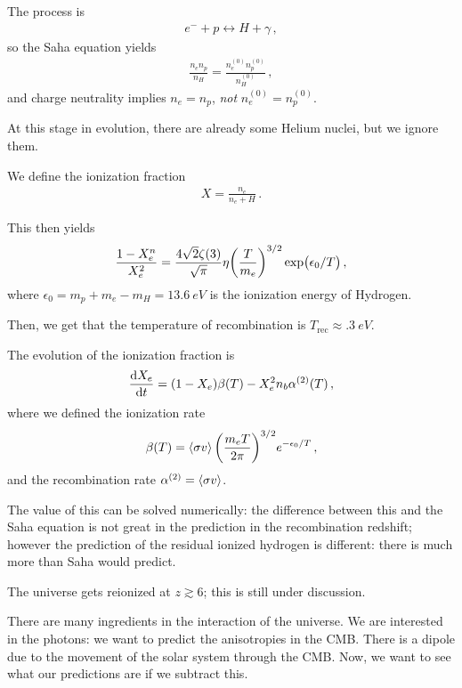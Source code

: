 \documentclass[main.tex]{subfiles}
\begin{document}
The process is 
%
\begin{align}
e^{-} + p \leftrightarrow H + \gamma 
\,,
\end{align}
%
so the Saha equation yields 
%
\begin{align}
\frac{n_e n_p}{n_H} = \frac{n_e^{(0)} n_p^{(0)}}{n_H^{(0)}}
\,,
\end{align}
%
and charge neutrality implies \(n_e = n_p\), \emph{not} \(n_e^{(0)} = n_p^{(0)}\). 

At this stage in evolution, there are already some Helium nuclei, but we ignore them. 

We define the ionization fraction 
%
\begin{align}
X = \frac{n_e}{n_e + H}
\,.
\end{align}

This then yields 
%
\begin{align}
\frac{1 - X_e^{n}}{X_e^{2}} = \frac{4 \sqrt{2} \zeta (3)}{\sqrt{\pi }} \eta \qty(\frac{T}{m_e})^{3/2} \exp(\epsilon_{0} / T)
\,,
\end{align}
%
where \(\epsilon_0 = m_p + m_e - m_H = \SI{13.6}{eV}\) is the ionization energy of Hydrogen. 

Then, we get that the temperature of recombination is \(T _{\text{rec}} \approx \SI{.3}{eV}\). 

The evolution of the ionization fraction is 
%
\begin{align}
\dv{X_{e}}{t} = (1-X_{e}) \beta (T) - X^2_{e} n_b \alpha^{(2)} (T)
\,,
\end{align}
%
where we defined the ionization rate 
%
\begin{align}
\beta (T) = \expval{\sigma v} \qty(\frac{m_e T}{2 \pi })^{3/2} e^{- \epsilon_0 /T}
\,,
\end{align}
%
and the recombination rate \(\alpha^{(2)} = \expval{\sigma v}\). 

The value of this can be solved numerically: the difference between this and the Saha equation is not great in the prediction in the recombination redshift; however the prediction of the residual ionized hydrogen is different: there is much more than Saha would predict. 

The universe gets reionized at \(z \gtrsim 6\); this is still under discussion. 

There are many ingredients in the interaction of the universe. We are interested in the photons: we want to predict the anisotropies in the CMB. 
There is a dipole due to the movement of the solar system through the CMB. Now, we want to see what our predictions are if we subtract this. 
\end{document}

